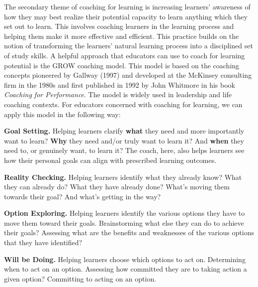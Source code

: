 \documentclass[
]{book}
\begin{document}
The secondary theme of coaching for learning is increasing learners' awareness of how they may best realize their potential capacity to learn anything which they set out to learn. This involves coaching learners in the learning process and helping them make it more effective and efficient. This practice builds on the notion of transforming the learners' natural learning process into a disciplined set of study skills. A helpful approach that educators can use to coach for learning potential is the GROW coaching model. This model is based on the coaching concepts pioneered by Gallway (1997) and developed at the McKinsey consulting firm in the 1980s and first published in 1992 by John Whitmore in his book \emph{Coaching for Performance}. The model is widely used in leadership and life coaching contexts. For educators concerned with coaching for learning, we can apply this model in the following way:

\begin{bonus}
\textbf{Goal Setting.} Helping learners clarify \textbf{what} they need
and more importantly want to learn? \textbf{Why} they need and/or truly
want to learn it? And \textbf{when} they need to, or genuinely want, to
learn it? The coach, here, also helps learners see how their personal
goals can align with prescribed learning outcomes.

\textbf{Reality Checking.} Helping learners identify what they already
know? What they can already do? What they have already done? What's
moving them towards their goal? And what's getting in the way?

\textbf{Option Exploring.} Helping learners identify the various options
they have to move them toward their goals. Brainstorming what else they
can do to achieve their goals? Assessing what are the benefits and
weaknesses of the various options that they have identified?

\textbf{Will be Doing.} Helping learners choose which options to act on.
Determining when to act on an option. Assessing how committed they are
to taking action a given option? Committing to acting on an option.
\end{bonus}
\end{document}
